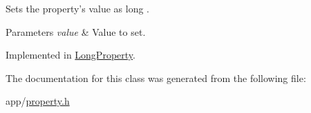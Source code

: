 Sets the property's value as long . 


\begin{DoxyParams}{Parameters}
{\em value} & Value to set. \\
\hline
\end{DoxyParams}


Implemented in \hyperlink{class_long_property_ad39da450d5291d57af3216dfc5008c28}{Long\-Property}.



The documentation for this class was generated from the following file\-:\begin{DoxyCompactItemize}
\item 
app/\hyperlink{property_8h}{property.\-h}\end{DoxyCompactItemize}
